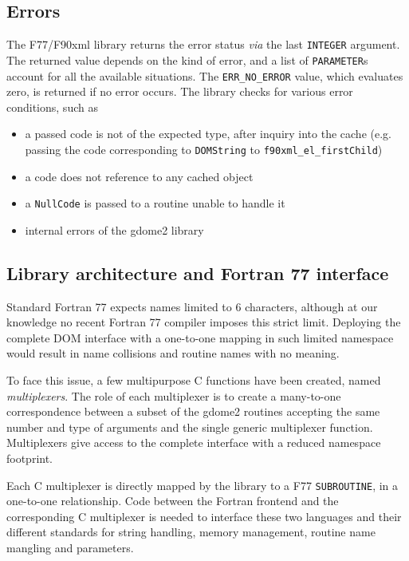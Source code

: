 \subsection*{Errors}

The F77/F90xml library returns the error status \textit{via} the last
\texttt{INTEGER} argument. The returned value depends on the kind of error,
and a list of \texttt{PARAMETER}s account for all the available situations.
The \texttt{ERR\_NO\_ERROR} value, which evaluates zero, is returned if no
error occurs. The library checks for various error conditions, such as
\begin{itemize}
\item a passed code is not of the expected type, after inquiry into the cache
(e.g. passing the code corresponding to \texttt{DOMString} to
\texttt{f90xml\_el\_firstChild})
\item a code does not reference to any cached object
\item a \texttt{NullCode} is passed to a routine unable to handle it
\item internal errors of the gdome2 library
\end{itemize}

\subsection*{Library architecture and Fortran 77 interface}

Standard Fortran 77 expects names limited to 6 characters, although at our
knowledge no recent Fortran 77 compiler imposes this strict limit. Deploying
the complete DOM interface with a one-to-one mapping in such limited
namespace would result in name collisions and routine names with no meaning.

To face this issue, a few multipurpose C functions have been created, named
\textit{multiplexers}.  The role of each multiplexer is to create a
many-to-one correspondence between a subset of the gdome2 routines accepting
the same number and type of arguments and the single generic multiplexer
function. Multiplexers give access to the complete interface with a reduced
namespace footprint.

Each C multiplexer is directly mapped by the library to a F77
\texttt{SUBROUTINE}, in a one-to-one relationship.  Code between the Fortran
frontend and the corresponding C multiplexer is needed to interface these
two languages and their different standards for string handling, memory
management, routine name mangling and parameters. 

